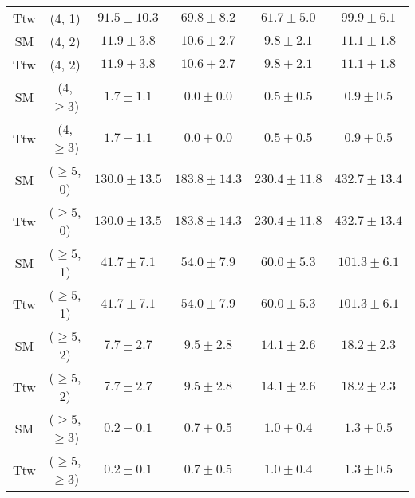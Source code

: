 \begin{table}[h!]
{\begin{tabular}{cccccc}
	Ttw & (4, 1) & $91.5\pm 10.3$ & $69.8\pm 8.2$ & $61.7\pm 5.0$ & $99.9\pm 6.1$ \\[0.5ex] 
	SM & (4, 2) & $11.9\pm 3.8$ & $10.6\pm 2.7$ & $9.8\pm 2.1$ & $11.1\pm 1.8$ \\[0.5ex] 
	Ttw & (4, 2) & $11.9\pm 3.8$ & $10.6\pm 2.7$ & $9.8\pm 2.1$ & $11.1\pm 1.8$ \\[0.5ex] 
	SM & (4, $\ge3$) & $1.7\pm 1.1$ & $0.0\pm 0.0$ & $0.5\pm 0.5$ & $0.9\pm 0.5$ \\[0.5ex] 
	Ttw & (4, $\ge3$) & $1.7\pm 1.1$ & $0.0\pm 0.0$ & $0.5\pm 0.5$ & $0.9\pm 0.5$ \\[0.5ex] 
	SM & ($\ge5$, 0) & $130.0\pm 13.5$ & $183.8\pm 14.3$ & $230.4\pm 11.8$ & $432.7\pm 13.4$ \\[0.5ex] 
	Ttw & ($\ge5$, 0) & $130.0\pm 13.5$ & $183.8\pm 14.3$ & $230.4\pm 11.8$ & $432.7\pm 13.4$ \\[0.5ex] 
	SM & ($\ge5$, 1) & $41.7\pm 7.1$ & $54.0\pm 7.9$ & $60.0\pm 5.3$ & $101.3\pm 6.1$ \\[0.5ex] 
	Ttw & ($\ge5$, 1) & $41.7\pm 7.1$ & $54.0\pm 7.9$ & $60.0\pm 5.3$ & $101.3\pm 6.1$ \\[0.5ex] 
	SM & ($\ge5$, 2) & $7.7\pm 2.7$ & $9.5\pm 2.8$ & $14.1\pm 2.6$ & $18.2\pm 2.3$ \\[0.5ex] 
	Ttw & ($\ge5$, 2) & $7.7\pm 2.7$ & $9.5\pm 2.8$ & $14.1\pm 2.6$ & $18.2\pm 2.3$ \\[0.5ex] 
	SM & ($\ge5$, $\ge3$) & $0.2\pm 0.1$ & $0.7\pm 0.5$ & $1.0\pm 0.4$ & $1.3\pm 0.5$ \\[0.5ex] 
	Ttw & ($\ge5$, $\ge3$) & $0.2\pm 0.1$ & $0.7\pm 0.5$ & $1.0\pm 0.4$ & $1.3\pm 0.5$ \\[0.5ex] 
	\hline
	\hline
\end{tabular}}
\end{table}
